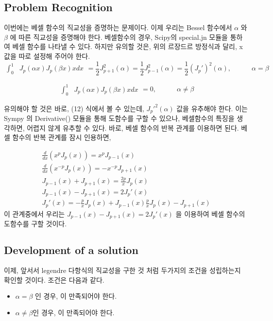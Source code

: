 \documentclass[11pt]{article}
\begin{document}
\subsection{Problem Recognition} 
 이번에는 베셀 함수의 직교성을 증명하는 문제이다.
이제 우리는 Bessel 함수에서 $\alpha$ 와 $\beta$ 에 따른 직교성을 증명해야 한다. 베셀함수의 경우, Scipy의 special.jn 모듈을 통하여 베셀 함수를 나타낼 수 있다. 하지만 유의할 것은, 위의 르장드르 방정식과 달리, x 값을 따로 설정해 주어야 한다. 
\begin{equation}
\begin{split}
    \int_0^1 &J_p(\alpha x) J_p(\beta x) x dx
    \end{split}   
    = \frac{1}{2} J_{p + 1}^2(\alpha) = \frac{1}{2} J_{p - 1}^2(\alpha) = \frac{1}{2} (J_p')^2(\alpha)
   		  , \quad \quad\quad\alpha = \beta
        \end{equation}

\begin{equation}
\begin{split}
    \int_0^1 &J_p(\alpha x) J_p(\beta x) x dx
    \end{split}   
    =  0
   		  , \quad \quad\quad\alpha \neq \beta
        \end{equation}

유의해야 할 것은 바로, (12) 식에서 볼 수 있는데, $J_p'^2(\alpha)$ 값을 유추해야 한다. 이는 Sympy 의 Derivative() 모듈을 통해 도함수를 구할 수 있으나, 베셀함수의 특징을 생각하면, 어렵지 않게 유추할 수 있다. 바로, 베셀 함수의 반복 관계를 이용하면 된다. 베셀 함수의 반복 관계를 잠시 인용하면,

\begin{equation}
\begin{array}{c}

\displaystyle
\frac{d}{dx} (x^p J_p(x))
=
x^p J_{p - 1}(x)
\\

\displaystyle
\frac{d}{dx} (x^{-p} J_p(x))
=
-x^{-p} J_{p + 1}(x)
\\

\displaystyle
J_{p - 1}(x) + J_{p + 1}(x)
=
\frac{2p}{x} J_p(x)
\\

\displaystyle
J_{p - 1}(x) - J_{p + 1}(x)
=
2 J_p'(x)
\\

\displaystyle
J_p'(x)
=
-\frac{p}{x} J_p(x) + J_{p - 1}(x)

\frac{p}{x} J_p(x) - J_{p + 1}(x)
\end{array}
        \end{equation}
        이 관계중에서 우리는 $J_{p - 1}(x) - J_{p + 1}(x)=2 J_p'(x)$ 을 이용하여 베셀 함수의 도함수를 구할 것이다.
        
\subsection{Development of a solution} 
이제, 앞서서 legendre 다항식의 직교성을 구한 것 처럼 두가지의 조건을 성립하는지 확인할 것이다. 조건은 다음과 같다.
\begin{itemize}
\item $\alpha= \beta$ 인 경우,   이 만족되어야 한다.
\item $\alpha \neq \beta$인 경우, 이 만족되어야 한다.
\end{itemize}
\end{document}
